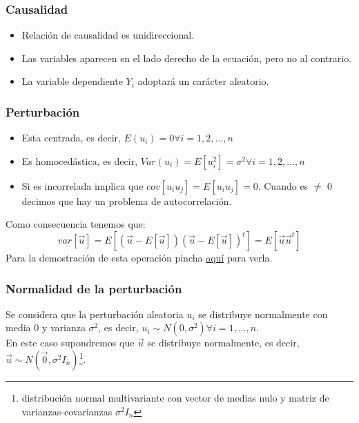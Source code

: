 \documentclass[a4paper,12pt]{article}
\begin{document}
\subsubsection{Causalidad}

\begin{itemize}
    \item Relación de causalidad es unidireccional.
    \item Las variables aparecen en el lado derecho de la ecuación, pero no al contrario.
    \item La variable dependiente $Y_i$ adoptará un carácter aleatorio.
\end{itemize}

\subsubsection{Perturbación}
\begin{itemize}
    \item Esta centrada, es decir, $E(u_i) = 0 \forall i=1,2,\ldots,n$
    \item Es homocedástica, es decir, $Var(u_i) = E[u_i^{2}]= \sigma^2 \forall i=1,2,\ldots,n$
    \item Si es incorrelada implica que $cov[u_iu_j] = E[u_iu_j]=0$. Cuando es $\neq$ 0 decimos que hay un problema de autocorrelación.
\end{itemize}

Como consecuencia tenemos que:
\begin{equation}
    var[\vec{u}] = E[(\vec{u}-E[\vec{u}])(\vec{u}-E[\vec{u}])^{t}] = E[\vec{u}\vec{u}^{t}]
\end{equation}
Para la demostración de esta operación pincha \href{https://github.com/ElblogdeIsmael/ElblogdeIsmael.github.io/blob/main/Subjects/Third/ECO/Formulario/FCCEE/ecotema2_1.pdf}{aquí} para verla.

\subsubsection{Normalidad de la perturbación}

Se considera que la perturbación aleatoria $u_i$ se distribuye normalmente con media 0 y varianza $\sigma^2$, es decir, $u_i \sim N(0,\sigma^2)\forall i=1,\ldots,n$.\\

En este caso supondremos que $\vec{u}$ se distribuye normalmente, es decir, $\vec{u} \sim N(\vec{0},\sigma^2I_n)$\footnote{distribución normal multivariante con vector de medias nulo y matriz de varianzas-covarianzas $\sigma^2I_n$}.
\end{document}
